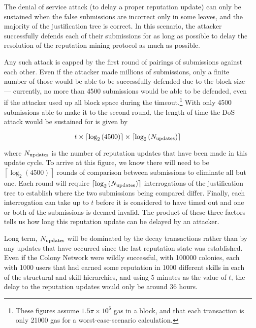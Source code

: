 The denial of service attack (to delay a proper reputation update) can only be sustained when the false submissions are incorrect only in some leaves, and the majority of the justification tree is correct. In this scenario, the attacker successfully defends each of their submissions for as long as possible to delay the resolution of the reputation mining protocol as much as possible.

Any such attack is capped by the first round of pairings of submissions against each other. Even if the attacker made millions of submissions, only a finite number of those would be able to be successfully defended due to the block size --- currently, no more than 4500 submissions would be able to be defended, even if the attacker used up all block space during the timeout.\footnote{These figures assume $1.5\pi\times10^6$ gas in a block, and that each transaction is only 21000 gas for a worst-case-scenario calculation.} With only 4500 submissions able to make it to the second round, the length of time the DoS attack would be sustained for is given by 

$$t \times \left\lceil\log_2\left(4500\right)\right\rceil\times \left\lceil\log_2\left(N_{\rm updates}\right)\right\rceil$$

\noindent where $N_{\rm updates}$ is the number of reputation updates that have been made in this update cycle. To arrive at this figure, we know there will need to be $\left\lceil\log_2\left(4500\right)\right\rceil$ rounds of comparison between submissions to eliminate all but one. Each round will require $\left\lceil\log_2\left(N_{\rm updates}\right)\right\rceil$ interrogations of the justification tree to establish where the two submissions being compared differ. Finally, each interrogation can take up to $t$ before it is considered to have timed out and one or both of the submissions is deemed invalid. The product of these three factors tells us how long this reputation update can be delayed by an attacker.

Long term, $N_{\rm updates}$ will be dominated by the decay transactions rather than by any updates that have occurred since the last reputation state was established. Even if the Colony Network were wildly successful, with 100000 colonies, each with 1000 users that had earned some reputation in 1000 different skills in each of the structural and skill hierarchies, and using 5 minutes as the value of $t$, the delay to the reputation updates would only be around $36$ hours.

